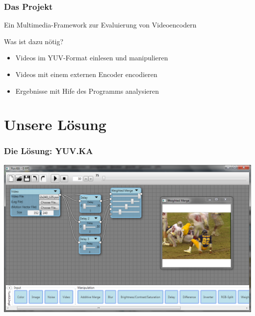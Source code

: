 \documentclass[t]{beamer}
\begin{document}
\begin{frame}
	\frametitle{Das Projekt}
	\begin{center}
		Ein Multimedia-Framework zur Evaluierung von Videoencodern	
	\end{center}
	 Was ist dazu nötig? \newline
	\begin{itemize}
		\item<1-> Videos im YUV-Format einlesen und manipulieren
		\item<1-> Videos mit einem externen Encoder encodieren
		\item<1-> Ergebnisse mit Hife des Programms analysieren
	\end{itemize}
\end{frame}

\section{Unsere Lösung}
\begin{frame}
	\frametitle{Die Lösung: YUV.KA}
	\begin{center}
		\includegraphics[height=.9\textheight]{startup_screenshot.png}
	\end{center}
\end{frame}
\end{document}
